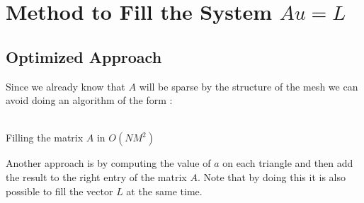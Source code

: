 \documentclass[a4paper]{report}
\begin{document}
\section{Method to Fill the System $Au=L$}
\subsection{Optimized Approach}
Since we already know that $A$ will be sparse by the structure of the mesh we can avoid doing an algorithm of the form :
\\
\\
\begin{algorithm}[H]
 \caption{Filling the matrix $A$ in $O(NM^2)$}
\end{algorithm}

Another approach is by computing the value of $a$ on each triangle and then add the result to the right entry of the matrix $A$. Note that by doing this it is also possible to fill the vector $L$ at the same time.
\end{document}
